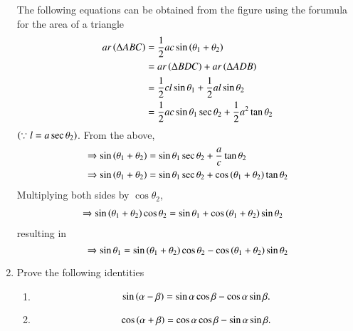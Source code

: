 \begin{enumerate}[label=\arabic*.,ref=\thesubsection.\theenumi]
\solution The following equations can be obtained from the figure using the forumula for the area of a triangle
%
\begin{align}
ar \left(\Delta ABC\right) &= \frac{1}{2}ac \sin\left(\theta_1 + \theta_2\right) \\
&= ar \left(\Delta BDC\right) + ar \left(\Delta ADB\right) \\
&= \frac{1}{2}cl \sin{\theta_1} + \frac{1}{2}al \sin{\theta_2} \\ 
&= \frac{1}{2}ac \sin{\theta_1} \sec \theta_2 + \frac{1}{2}a^2 \tan{\theta_2} 
\end{align}
$\left(\because
	l = a \sec \theta_2\right)$.  From the above,
\begin{align}
\Rightarrow \sin\left(\theta_1 + \theta_2\right) &=  \sin{\theta_1} \sec \theta_2 + \frac{a}{c} \tan{\theta_2} \\
\Rightarrow \sin\left(\theta_1 + \theta_2\right) &=  \sin{\theta_1} \sec \theta_2 + \cos\left(\theta_1 + \theta_2\right) \tan{\theta_2} 
\end{align}
Multiplying both sides by $\cos \theta_2$,
\begin{align}
\Rightarrow \sin\left(\theta_1 + \theta_2\right)\cos{\theta_2} &=  \sin{\theta_1}  + \cos\left(\theta_1 + \theta_2\right) \sin\theta_2  
\end{align}
%
resulting in
\begin{equation}
\Rightarrow \sin \theta_1 = \sin\left(\theta_1 + \theta_2\right)\cos{\theta_2} - \cos\left(\theta_1 + \theta_2\right) \sin\theta_2 
\end{equation}
\item
	Prove the following identities 
	\begin{enumerate}
\item 
\begin{equation}
		\label{ch5_sin_diff}
\sin\left(\alpha - \beta\right) = \sin \alpha \cos \beta - \cos \alpha \sin \beta.
\end{equation}
\item 
\begin{equation}
\cos\left(\alpha + \beta\right) = \cos \alpha \cos \beta - \sin \alpha \sin \beta.
		\label{ch5_cos_diff}
\end{equation}

	\end{enumerate}


\end{enumerate}
